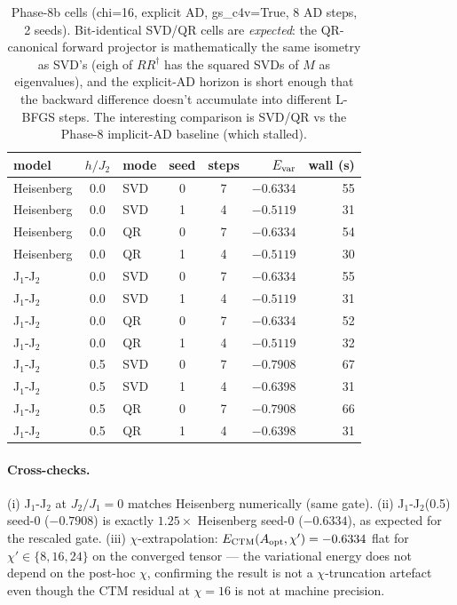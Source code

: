 \documentclass[aps,prresearch,reprint,amsmath,amssymb,floatfix]{revtex4-2}
\begin{document}
\begin{table}[h]
\centering
\caption{Phase-8b cells (chi=16, explicit AD, gs\_c4v=True, 8 AD steps,
2 seeds).  Bit-identical SVD/QR cells are \emph{expected}: the QR-canonical
forward projector is mathematically the same isometry as SVD's (eigh of
$RR^\dagger$ has the squared SVDs of $M$ as eigenvalues), and the explicit-AD
horizon is short enough that the backward difference doesn't accumulate
into different L-BFGS steps. The interesting comparison is SVD/QR vs the
Phase-8 implicit-AD baseline (which stalled).}
\label{tab:p8b}
\begin{tabular}{l c l c c r r}
\toprule
model & $h/J_2$ & mode & seed & steps & $E_{\rm var}$ & wall (s) \\
\midrule
Heisenberg   & 0.0 & SVD  & 0 & 7 & $-0.6334$ & 55 \\
Heisenberg   & 0.0 & SVD  & 1 & 4 & $-0.5119$ & 31 \\
Heisenberg   & 0.0 & QR   & 0 & 7 & $-0.6334$ & 54 \\
Heisenberg   & 0.0 & QR   & 1 & 4 & $-0.5119$ & 30 \\
J$_1$-J$_2$  & 0.0 & SVD  & 0 & 7 & $-0.6334$ & 55 \\
J$_1$-J$_2$  & 0.0 & SVD  & 1 & 4 & $-0.5119$ & 31 \\
J$_1$-J$_2$  & 0.0 & QR   & 0 & 7 & $-0.6334$ & 52 \\
J$_1$-J$_2$  & 0.0 & QR   & 1 & 4 & $-0.5119$ & 32 \\
J$_1$-J$_2$  & 0.5 & SVD  & 0 & 7 & $-0.7908$ & 67 \\
J$_1$-J$_2$  & 0.5 & SVD  & 1 & 4 & $-0.6398$ & 31 \\
J$_1$-J$_2$  & 0.5 & QR   & 0 & 7 & $-0.7908$ & 66 \\
J$_1$-J$_2$  & 0.5 & QR   & 1 & 4 & $-0.6398$ & 31 \\
\bottomrule
\end{tabular}
\end{table}

\paragraph{Cross-checks.}
(i) J$_1$-J$_2$ at $J_2/J_1\!=\!0$ matches Heisenberg numerically (same gate).
(ii) J$_1$-J$_2$(0.5) seed-0 ($-0.7908$) is exactly $1.25\times$ Heisenberg
seed-0 ($-0.6334$), as expected for the rescaled gate.
(iii) $\chi$-extrapolation: $E_{\rm CTM}(A_{\rm opt}, \chi') = -0.6334$
flat for $\chi'\in\{8,16,24\}$ on the converged tensor --- the variational
energy does not depend on the post-hoc $\chi$, confirming the result is
not a $\chi$-truncation artefact even though the CTM residual at $\chi=16$
is not at machine precision.
\end{document}
